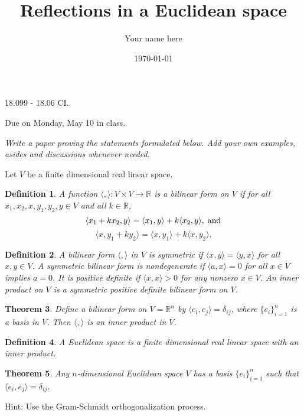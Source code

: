 \documentclass[11pt]{amsart}
\newcommand{\R}{\mathbb R}
\newcommand{\la}{\langle}
\newcommand{\ra}{\rangle}
\newtheorem{theorem}{Theorem}
\newtheorem{definition}[theorem]{Definition}
\begin{document}
\title{Reflections in a Euclidean space}
\author{Your name here}
\date{\today}
\maketitle


{\Large  18.099 - 18.06 CI.} 

{Due on Monday, May 10 in class.} 

\vspace{1cm} 

{\it Write a paper proving the statements formulated below. Add your own 
examples, asides and discussions whenever needed. }


Let $V$ be a finite dimensional real linear space. 

\begin{definition} 
A function $\la , \ra : V \times V \to \R$ is a \emph{bilinear form} on $V$ 
if for all $x_1, x_2, x, y_1, y_2, y \in V$ and all $k \in \R$, 
 $$ \la x_1 + k x_2, y \ra = \la x_1, y \ra + k \la x_2, y \ra ,\;{\rm and} $$
 $$ \la x, y_1 + k y_2 \ra = \la x, y_1 \ra + k \la x, y_2 \ra .$$
\end{definition}

\begin{definition} \label{inpr} 
A bilinear form $\la , \ra$ in $V$ is \emph{symmetric} if 
$\la x, y \ra = \la y, x \ra$ for all $x, y \in V$. A symmetric bilinear 
form is \emph{nondegenerate} 
if $\la a, x \ra =0 $ for all $x \in V$ implies $a =0$. 
It is \emph{positive definite} if $\la x,x \ra >0$ for
any nonzero $x \in V$. 
An \emph{inner product} on $V$ is   
a symmetric positive definite bilinear form on $V$.  
\end{definition}

\begin{theorem} Define a bilinear form on $V = \R^n$ by 
$\la e_i, e_j \ra = \delta_{ij}$, where $\{ e_i\}_{i=1}^n$ is a basis in $V$. 
Then $\la , \ra$ is an inner product in $V$. 
\end{theorem} 

\begin{definition} A \emph{Euclidean space} is a finite dimensional real 
linear space with an inner product. 
\end{definition} 

\begin{theorem} Any $n$-dimensional Euclidean space $V$ 
has a basis $\{ e_i \}_{i=1}^n$
such that $\la e_i , e_j \ra = \delta_{ij}$. 
\end{theorem} 
Hint: Use the Gram-Schmidt orthogonalization process. 
\end{document}
